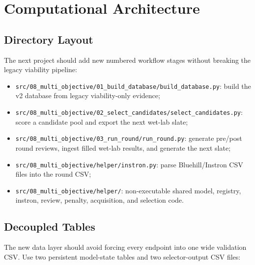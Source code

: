 \documentclass[11pt]{article}
\newcommand{\code}[1]{\texttt{#1}}
\begin{document}
\section{Computational Architecture}

\subsection{Directory Layout}

The next project should add new numbered workflow stages without breaking the legacy
viability pipeline:
\begin{itemize}
    \item \code{src/08\_multi\_objective/01\_build\_database/build\_database.py}:
    build the v2 database from legacy viability-only evidence;
    \item \code{src/08\_multi\_objective/02\_select\_candidates/select\_candidates.py}:
    score a candidate pool and export the next wet-lab slate;
    \item \code{src/08\_multi\_objective/03\_run\_round/run\_round.py}:
    generate pre/post round reviews, ingest filled wet-lab results, and generate the next slate;
    \item \code{src/08\_multi\_objective/helper/instron.py}:
    parse Bluehill/Instron CSV files into the round CSV;
    \item \code{src/08\_multi\_objective/helper/}: non-executable shared model,
    registry, instron, review, penalty, acquisition, and selection code.
\end{itemize}

\subsection{Decoupled Tables}

The new data layer should avoid forcing every endpoint into one wide validation CSV.
Use two persistent model-state tables and two selector-output CSV files:
\end{document}
